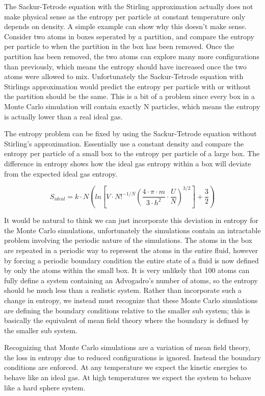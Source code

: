 The Sackur-Tetrode equation with the Stirling approximation actually does not make physical sense as the entropy per particle at constant temperature only depends on density. A simple example can show why this doesn't make sense. Consider two atoms in boxes seperated by a partition, and compare the entropy per particle to when the partition in the box has been removed. Once the partition has been removed, the two atoms can explore many more configurations than previously, which means the entropy should have increased once the two atoms were allowed to mix. Unfortunately the Sackur-Tetrode equation with Stirlings approximation would predict the entropy per particle with or without the partition should be the same. This is a bit of a problem since every box in a Monte Carlo simulation will contain exactly N particles, which means the entropy is actually lower than a real ideal gas.

The entropy problem can be fixed by using the Sackur-Tetrode equation without Stirling's approximation. Essentially use a constant density and compare the entropy per particle of a small box to the entropy per particle of a large box. The difference in entropy shows how the ideal gas entropy within a box will deviate from the expected ideal gas entropy.

$$S_{ideal}=k\cdot N \left ( ln\left [ V\cdot N!^{-1/N}\left ( \frac{4\cdot \pi\cdot m}{3\cdot h^2}\cdot\frac{U}{N} \right)^{3/2}  \right]+\frac{3}{2}\right )$$

It would be natural to think we can just incorporate this deviation in entropy for the Monte Carlo simulations, unfortunately the simulations contain an intractable problem involving the periodic nature of the simulations. The atoms in the box are repeated in a periodic way to represent the atoms in the entire fluid, however by forcing a periodic boundary condition the entire state of a fluid is now defined by only the atoms within the small box. It is very unlikely that 100 atoms can fully define a system containing an Advogadro's number of atoms, so the entropy should be much less than a realistic system. Rather than incorporate such a change in entropy, we instead must recognize that these Monte Carlo simulations are defining the boundary conditions relative to the smaller sub system; this is basically the equivalent of mean field theory where the boundary is defined by the smaller sub system. 

Recognizing that Monte Carlo simulations are a variation of mean field theory, the loss in entropy due to reduced configurations is ignored. Instead the boundary conditions are enforced. At any temperature we expect the kinetic energies to behave like an ideal gas. At high temperatures we expect the system to behave like a hard sphere system.

